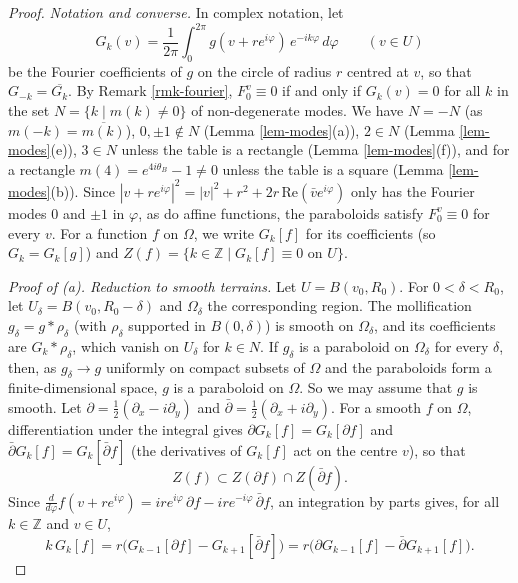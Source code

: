 \documentclass[a4paper,11pt,twoside,leqno]{article}
\newcommand{\zz}[0]{\ensuremath{\mathbb{Z}}}
\numberwithin{equation}{section}
\begin{document}
\begin{proof}
\emph{Notation and converse.} In complex notation, let
\[
G_k(v) = \frac{1}{2\pi}\int_0^{2\pi} g(v + r e^{i\varphi})\, e^{-ik\varphi}\, d\varphi \qquad (v \in U)
\]
be the Fourier coefficients of $g$ on the circle of radius $r$ centred at $v$, so that $G_{-k} = \overline{G_k}$. By Remark \ref{rmk-fourier}, $F_0^v \equiv 0$ if and only if $G_k(v) = 0$ for all $k$ in the set $N = \{k \mid m(k) \neq 0\}$ of non-degenerate modes. We have $N = -N$ (as $m(-k) = \overline{m(k)}$), $0, \pm 1 \notin N$ (Lemma \ref{lem-modes}(a)), $2 \in N$ (Lemma \ref{lem-modes}(e)), $3 \in N$ unless the table is a rectangle (Lemma \ref{lem-modes}(f)), and for a rectangle $m(4) = e^{4i\theta_B} - 1 \neq 0$ unless the table is a square (Lemma \ref{lem-modes}(b)). Since $|v + re^{i\varphi}|^2 = |v|^2 + r^2 + 2r\,\mathrm{Re}(\bar v e^{i\varphi})$ only has the Fourier modes $0$ and $\pm 1$ in $\varphi$, as do affine functions, the paraboloids satisfy $F_0^v \equiv 0$ for every $v$. For a function $f$ on $\Omega$, we write $G_k[f]$ for its coefficients (so $G_k = G_k[g]$) and $Z(f) = \{k \in \zz \mid G_k[f] \equiv 0 \text{ on } U\}$.

\emph{Proof of (a). Reduction to smooth terrains.} Let $U = B(v_0, R_0)$. For $0 < \delta < R_0$, let $U_\delta = B(v_0, R_0 - \delta)$ and $\Omega_\delta$ the corresponding region. The mollification $g_\delta = g * \rho_\delta$ (with $\rho_\delta$ supported in $B(0,\delta)$) is smooth on $\Omega_\delta$, and its coefficients are $G_k * \rho_\delta$, which vanish on $U_\delta$ for $k \in N$. If $g_\delta$ is a paraboloid on $\Omega_\delta$ for every $\delta$, then, as $g_\delta \to g$ uniformly on compact subsets of $\Omega$ and the paraboloids form a finite-dimensional space, $g$ is a paraboloid on $\Omega$. So we may assume that $g$ is smooth. Let $\partial = \frac{1}{2}(\partial_x - i \partial_y)$ and $\bar\partial = \frac{1}{2}(\partial_x + i\partial_y)$. For a smooth $f$ on $\Omega$, differentiation under the integral gives $\partial G_k[f] = G_k[\partial f]$ and $\bar\partial G_k[f] = G_k[\bar\partial f]$ (the derivatives of $G_k[f]$ act on the centre $v$), so that
\[
Z(f) \subset Z(\partial f) \cap Z(\bar\partial f).
\]
Since $\frac{d}{d\varphi} f(v + re^{i\varphi}) = ir e^{i\varphi}\, \partial f - ir e^{-i\varphi}\, \bar\partial f$, an integration by parts gives, for all $k \in \zz$ and $v \in U$,
\begin{equation}\label{eq-rec}
k\, G_k[f] = r\big(G_{k-1}[\partial f] - G_{k+1}[\bar\partial f]\big) = r\big(\partial G_{k-1}[f] - \bar\partial G_{k+1}[f]\big).
\end{equation}


\end{proof}
\end{document}
